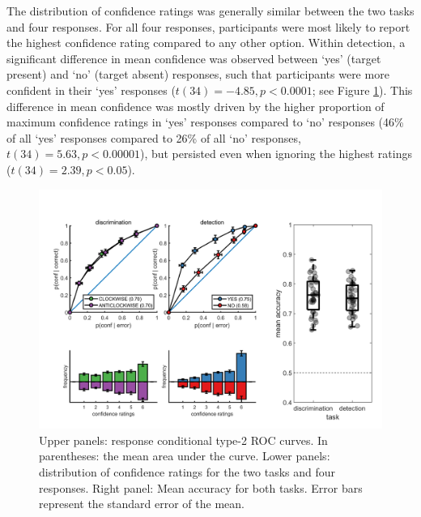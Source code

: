 \documentclass[12pt,twoside]{reedthesis}
\begin{document}
The distribution of confidence ratings was generally similar between the two tasks and four responses. For all four responses, participants were most likely to report the highest confidence rating compared to any other option. Within detection, a significant difference in mean confidence was observed between `yes' (target present) and `no' (target absent) responses, such that participants were more confident in their `yes' responses (\(t(34) = -4.85, p<0.0001\); see Figure \ref{fig:ch3-exp1-behaviour}). This difference in mean confidence was mostly driven by the higher proportion of maximum confidence ratings in `yes' responses compared to `no' responses (46\% of all `yes' responses compared to 26\% of all `no' responses, \(t(34)=5.63, p<0.00001\)), but persisted even when ignoring the highest ratings (\(t(34)=2.39, p<0.05\)).
\begin{figure}
\includegraphics[width=\linewidth]{figure/ch3/behaviour} \caption[Behavioural results, imaging experiment]{Upper panels: response conditional type-2 ROC curves. In parentheses: the mean area under the curve. Lower panels: distribution of confidence ratings for the two tasks and four responses. Right panel: Mean accuracy for both tasks. Error bars represent the standard error of the mean.}\label{fig:ch3-exp1-behaviour}
\end{figure}
\end{document}
